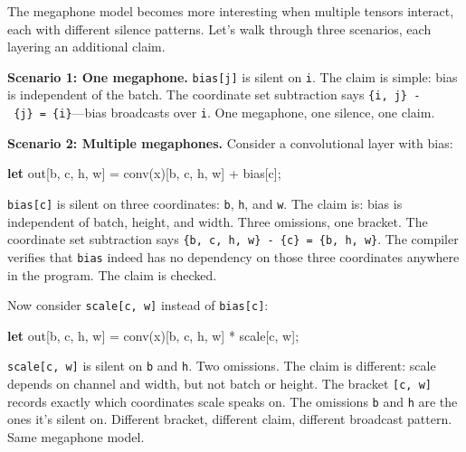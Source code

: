 \documentclass[11pt,titlepage]{article}
\newenvironment{Shaded}{}{}
\newcommand{\KeywordTok}[1]{\textcolor[rgb]{0.00,0.44,0.13}{\textbf{#1}}}
\newcommand{\NormalTok}[1]{#1}
\newcommand{\OperatorTok}[1]{\textcolor[rgb]{0.40,0.40,0.40}{#1}}
\begin{document}
The megaphone model becomes more interesting when multiple tensors
interact, each with different silence patterns. Let's walk through three
scenarios, each layering an additional claim.

\textbf{Scenario 1: One megaphone.} \texttt{bias{[}j{]}} is silent on
\texttt{i}. The claim is simple: bias is independent of the batch. The
coordinate set subtraction says
\texttt{\{i,\ j\}\ -\ \{j\}\ =\ \{i\}}---bias broadcasts over
\texttt{i}. One megaphone, one silence, one claim.

\textbf{Scenario 2: Multiple megaphones.} Consider a convolutional layer
with bias:

\begin{Shaded}
\begin{Highlighting}[]
\KeywordTok{let}\NormalTok{ out}\OperatorTok{[}\NormalTok{b, c, h, w}\OperatorTok{]}\NormalTok{ = conv(x)}\OperatorTok{[}\NormalTok{b, c, h, w}\OperatorTok{]}\NormalTok{ + bias}\OperatorTok{[}\NormalTok{c}\OperatorTok{]}\NormalTok{;}
\end{Highlighting}
\end{Shaded}

\texttt{bias{[}c{]}} is silent on three coordinates: \texttt{b},
\texttt{h}, and \texttt{w}. The claim is: bias is independent of batch,
height, and width. Three omissions, one bracket. The coordinate set
subtraction says \texttt{\{b,\ c,\ h,\ w\}\ -\ \{c\}\ =\ \{b,\ h,\ w\}}.
The compiler verifies that \texttt{bias} indeed has no dependency on
those three coordinates anywhere in the program. The claim is checked.

Now consider \texttt{scale{[}c,\ w{]}} instead of \texttt{bias{[}c{]}}:

\begin{Shaded}
\begin{Highlighting}[]
\KeywordTok{let}\NormalTok{ out}\OperatorTok{[}\NormalTok{b, c, h, w}\OperatorTok{]}\NormalTok{ = conv(x)}\OperatorTok{[}\NormalTok{b, c, h, w}\OperatorTok{]}\NormalTok{ * scale}\OperatorTok{[}\NormalTok{c, w}\OperatorTok{]}\NormalTok{;}
\end{Highlighting}
\end{Shaded}

\texttt{scale{[}c,\ w{]}} is silent on \texttt{b} and \texttt{h}. Two
omissions. The claim is different: scale depends on channel and width,
but not batch or height. The bracket \texttt{{[}c,\ w{]}} records
exactly which coordinates scale speaks on. The omissions \texttt{b} and
\texttt{h} are the ones it's silent on. Different bracket, different
claim, different broadcast pattern. Same megaphone model.
\end{document}
